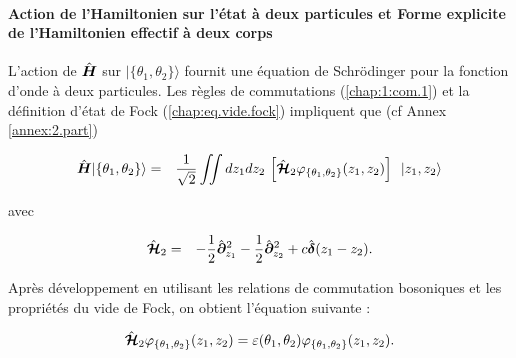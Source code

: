 \paragraph{Action de l’Hamiltonien sur l’état à deux particules et Forme explicite de l’Hamiltonien effectif à deux corps}

L’action de \(\hat{\bm{H}}\) sur \(\vert \{\theta_1, \theta_2\} \rangle\) fournit une équation de Schrödinger pour la fonction d’onde à deux particules. 
Les règles de commutations (\ref{chap:1:com.1}) et la définition d'état de Fock (\ref{chap:eq.vide.fock}) impliquent que (cf Annex \ref{annex:2.part}) 
%


\begin{eqnarray}
	\operator{H}\vert \{\theta_1, \theta_2\} \rangle &= &  \frac{1}{ \sqrt{2}}  \iint dz_1 dz_2 \,  	\left [ \operator{\mathcal{H}}_2 \varphi_{\{\theta_1 , \theta_2\}}(z_1, z_2) \right ] \, \vert z_1 , z_2 \rangle		
\end{eqnarray}

avec 

\begin{eqnarray}
	\hat{\bm{\mathcal{H}}}_2 & = &  - \frac{1}{2} \hat{\bm{\partial}}_{z_1}^2 - \frac{1}{2} \hat{\bm{\partial}}_{z_2}^2+ 	c  \hat{\bm{\delta}}(z_1 - z_2). \label{chap:1:hal.mod.2.part.3} 		
\end{eqnarray}


Après développement en utilisant les relations de commutation bosoniques et les propriétés du vide de Fock, on obtient l’équation suivante :

\begin{eqnarray}
	\hat{\bm{\mathcal{H}}}_2 \varphi_{\{\theta_1 , \theta_2\}}(z_1, z_2) = \varepsilon(\theta_1 , \theta_2 ) \varphi_{\{\theta_1 , \theta_2\}}(z_1, z_2). \label{chap:eq.twobody}
\end{eqnarray}



